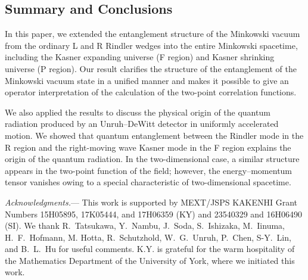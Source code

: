 \documentclass[aps,prd,preprintnumbers,nofootinbib,showpacs]{revtex4}%
\begin{document}
\begin{widetext}
\section{Summary and Conclusions}
In this paper, we extended the entanglement structure of the Minkowski vacuum 
from the ordinary L and R Rindler wedges into the entire 
Minkowski spacetime, including 
the Kasner expanding universe (F region) and Kasner shrinking universe (P region). 
Our result clarifies the structure of the entanglement of the Minkowski vacuum state in a unified manner and 
makes it possible to give an operator interpretation of the calculation of
the two-point correlation functions.

We also applied the results to discuss the physical origin of 
 the quantum radiation produced by an Unruh--DeWitt detector
in uniformly accelerated motion. 
We showed that quantum entanglement between the Rindler mode 
in the R region and the right-moving wave Kasner mode in the F region explains the origin of 
 the quantum radiation. 
In the two-dimensional case, a similar structure appears in the two-point function
of the field; however, the energy--momentum tensor vanishes owing to a special characteristic
of two-dimensional spacetime.


\vspace{2mm}
{\it Acknowledgments.}---
This work is supported by MEXT/JSPS KAKENHI Grant Numbers 15H05895, 
17K05444, and 17H06359 (KY) and 23540329 and 16H06490 (SI). 
We thank R.~Tatsukawa, Y.~Nambu, J.~Soda, S.~Ishizaka, M.~Iinuma, H.~F.~Hofmann,
M. Hotta, R.~Schutzhold, W.~G.~Unruh, P.~Chen, S-Y.~Lin, and B.~L.~Hu for useful comments.
K.Y. is grateful for the warm hospitality of the Mathematics Department 
of the University of York, where we initiated this work. 


\appendix


\end{widetext}
\end{document}

